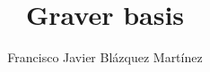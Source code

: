 \documentclass[logo]{style/usydthesis}
\begin{document}
\renewcommand{\thepage}{\roman{page}}	
\title{{\bf\Huge Graver basis}}
\author{Francisco Javier Blázquez Martínez}

\maketitle
{}





\setcounter{tocdepth}{2}
\newpage
{}
\tableofcontents
\listoffigures


\setcounter{page}{1}
\setcounter{chapter}{0}

\renewcommand{\thepage}{\arabic{page}}	
\setupParagraphs








%
%
\printbibliography

%
\end{document}
